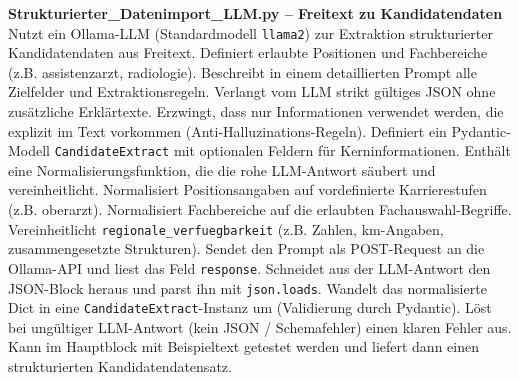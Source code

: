 
\textbf{Strukturierter\_Datenimport\_LLM.py -- Freitext zu Kandidatendaten}
Nutzt ein Ollama-LLM (Standardmodell \texttt{llama2}) zur Extraktion strukturierter Kandidatendaten aus Freitext.
Definiert erlaubte Positionen und Fachbereiche (z.B. \glqq assistenzarzt\grqq{}, \glqq radiologie\grqq{}).
Beschreibt in einem detaillierten Prompt alle Zielfelder und Extraktionsregeln.
Verlangt vom LLM strikt gültiges JSON ohne zusätzliche Erklärtexte.
Erzwingt, dass nur Informationen verwendet werden, die explizit im Text vorkommen (Anti-Halluzinations-Regeln).
Definiert ein Pydantic-Modell \texttt{CandidateExtract} mit optionalen Feldern für Kerninformationen.
Enthält eine Normalisierungsfunktion, die die rohe LLM-Antwort säubert und vereinheitlicht.
Normalisiert Positionsangaben auf vordefinierte Karrierestufen (z.B. \glqq oberarzt\grqq{}).
Normalisiert Fachbereiche auf die erlaubten Fachauswahl-Begriffe.
Vereinheitlicht \texttt{regionale\_verfuegbarkeit} (z.B. Zahlen, km-Angaben, zusammengesetzte Strukturen).
Sendet den Prompt als POST-Request an die Ollama-API und liest das Feld \texttt{response}.
Schneidet aus der LLM-Antwort den JSON-Block heraus und parst ihn mit \texttt{json.loads}.
Wandelt das normalisierte Dict in eine \texttt{CandidateExtract}-Instanz um (Validierung durch Pydantic).
Löst bei ungültiger LLM-Antwort (kein JSON / Schemafehler) einen klaren Fehler aus.
Kann im Hauptblock mit Beispieltext getestet werden und liefert dann einen strukturierten Kandidatendatensatz.


